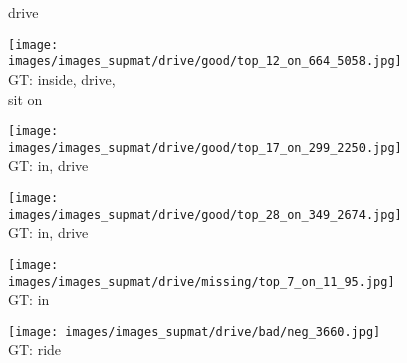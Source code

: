 \documentclass[10pt,twocolumn,letterpaper]{article}
\begin{document}
\begin{figure*}[t]
\begin{minipage}[t]{0.005\textwidth}
    	\centering
	\vspace{-8.5ex}
    	\begin{turn}{90}
    	drive
    	\end{turn}
    	\vspace{2ex}
   	\end{minipage}
    \hspace{0.01\textwidth}
\begin{minipage}[t]{0.18\textwidth}
    	\centering
       	\texttt{[image: images/images\_supmat/drive/good/top\_12\_on\_664\_5058.jpg]}\\
       	\vspace{0.3ex}
GT: inside, drive, \\
       	sit on
       	\vspace{2ex}
    \end{minipage}
    \hspace{0.005\textwidth}
\begin{minipage}[t]{0.18\textwidth}
    	\centering
       	\texttt{[image: images/images\_supmat/drive/good/top\_17\_on\_299\_2250.jpg]}\\
       	\vspace{0.3ex}
GT: in, drive
       	\vspace{0.2ex}
    \end{minipage}  
    \hspace{0.005\textwidth}
\begin{minipage}[t]{0.18\textwidth}
    	\centering
       	\texttt{[image: images/images\_supmat/drive/good/top\_28\_on\_349\_2674.jpg]}\\
       	\vspace{0.3ex}
GT: in, drive
       	\vspace{0.2ex}
    \end{minipage} 
    \hspace{0.005\textwidth}
\begin{minipage}[t]{0.18\textwidth}
       	\centering
    	\texttt{[image: images/images\_supmat/drive/missing/top\_7\_on\_11\_95.jpg]}\\
    	\vspace{0.3ex}
GT: in
       	\vspace{0.2ex}
    \end{minipage}
    \hspace{0.005\textwidth}
\begin{minipage}[t]{0.18\textwidth}
    	\centering
       	\texttt{[image: images/images\_supmat/drive/bad/neg\_3660.jpg]}\\
       	\vspace{0.3ex}
GT: ride
       	\vspace{0.2ex}
    \end{minipage}   



\end{figure*}
\end{document}
